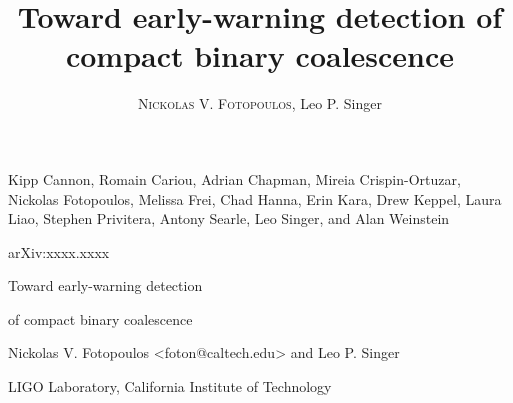 \documentclass[portrait,plainboxedsections]{sciposter}
\title{Toward early-warning detection of compact binary coalescence}
\author{\textsc{Nickolas V. Fotopoulos}, Leo P. Singer}
\institute{\LIGO{} Laboratory, California Institute of Technology}
\begin{document}

\begin{minipage}[t]{0.25\textwidth}
\raggedleft
{}
	Kipp Cannon,
	Romain Cariou,
	Adrian Chapman,
	Mireia Crispin-Ortuzar,
	Nickolas Fotopoulos,
	Melissa Frei,
	Chad Hanna,
	Erin Kara,
	Drew Keppel,
	Laura Liao,
	Stephen Privitera,
	Antony Searle,
	Leo Singer, and
	Alan Weinstein

\vspace{3mm}
\fontsize{36}{50}\selectfont
arXiv:xxxx.xxxx
\end{minipage}%
\hspace{0.05\textwidth}%
\begin{minipage}[t]{0.6\textwidth}
{\fontsize{80}{100}\selectfont%
Toward early-warning detection

of compact binary coalescence

\fontsize{40}{70}\selectfont
\vspace{0.5em}
Nickolas V. Fotopoulos <foton@caltech.edu> and Leo P. Singer

\fontsize{36}{50}\selectfont
\vspace{0.5em}
LIGO Laboratory, California Institute of Technology
}
\end{minipage}
\vspace{1cm}
\end{document}
